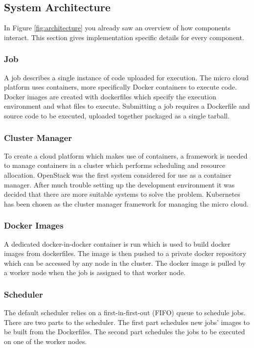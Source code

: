 \documentclass{sig-alternate-05-2015}
\begin{document}
\subsection{System Architecture}
In Figure \ref{fig:architecture} you already saw an overview of how components interact. This section gives implementation specific details for every component.

\subsubsection{Job}
A job describes a single instance of code uploaded for execution. 
The micro cloud platform uses containers, more specifically Docker containers to execute code. Docker images are created with dockerfiles which specify the execution environment and what files to execute. Submitting a job requires a Dockerfile and source code to be executed, uploaded together packaged as a single tarball.  

\subsubsection{Cluster Manager}
To create a cloud platform which makes use of containers, a framework is needed to manage containers in a cluster which performs scheduling and resource allocation. OpenStack was the first system considered for use as a container manager. After much trouble setting up the development environment it was decided that there are more suitable systems to solve the problem. Kubernetes has been chosen as the cluster manager framework for managing the micro cloud.

\subsubsection{Docker Images}
A dedicated docker-in-docker container is run which is used to build docker images from dockerfiles. The image is then pushed to a private docker repository which can be accessed by any node in the cluster. The docker image is pulled by a worker node when the job is assigned to that worker node.

\subsubsection{Scheduler}
The default scheduler relies on a first-in-first-out (FIFO) queue to schedule jobs. There are two parts to the scheduler. The first part schedules new jobs' images to be built from the Dockerfiles. The second part schedules the jobs to be executed on one of the worker nodes.
\end{document}
